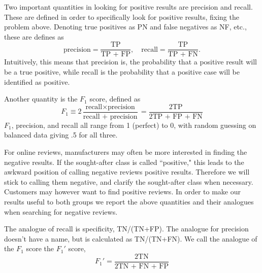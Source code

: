 \documentclass{article} %
\begin{document}
	Two important quantities in looking for positive results are precision and recall. These are defined in order to specifically look for positive results, fixing the problem above. Denoting true positives as PN and false negatives as NF, etc., these are defines as 
	\begin{equation}
	\mbox{precision} = \frac{\mbox {TP}}{\mbox {TP + FP}},\quad \mbox{recall} = \frac{\mbox {TP}}{\mbox {TP + FN}}.
	\end{equation}
	Intuitively, this means that precision is, the probability that a positive result will be a true positive, while recall is the probability that a positive case will be identified as positive.
	
	Another quantity is the $F_1$ score, defined as
	\begin{equation}
	F_1 \equiv 2\frac{\mbox{recall}\times\mbox{precision}}{\mbox{recall +
			precision}} = \frac{\mbox{2TP}}{\mbox{2TP + FP + FN}}
	\end{equation}
	$F_1$, precision, and recall all range from 1 (perfect) to 0, with random guessing on balanced data giving .5 for all three.
	
	For online reviews, manufacturers may often be more interested in finding the negative results. If the sought-after class is called ``positive," this leads to the awkward position of calling negative reviews positive results. Therefore we will stick to calling them negative, and clarify the sought-after class when necessary. Customers may however want to find positive reviews. In order to make our results useful to both groups we report the above quantities and their analogues when searching for negative reviews.
	
	The analogue of recall is specificity, TN/(TN+FP). The analogue for precision doesn't have a name, but is calculated as TN/(TN+FN). We call the analogue of the $F_1$ score the $F_1'$ score,
	\begin{equation}
	F_1' = \frac{\mbox{2TN}}{\mbox{2TN + FN + FP}}
	\end{equation}
	
\end{document}

